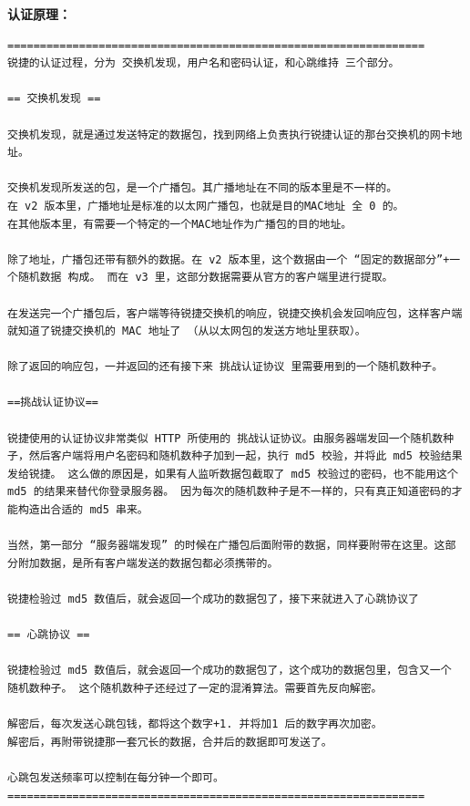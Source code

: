 \documentclass{itecreport-zh}
\begin{document}
\textbf{认证原理：}
\begin{verbatim}
================================================================
锐捷的认证过程，分为 交换机发现，用户名和密码认证，和心跳维持 三个部分。

== 交换机发现 ==

交换机发现，就是通过发送特定的数据包，找到网络上负责执行锐捷认证的那台交换机的网卡地址。

交换机发现所发送的包，是一个广播包。其广播地址在不同的版本里是不一样的。
在 v2 版本里，广播地址是标准的以太网广播包，也就是目的MAC地址 全 0 的。
在其他版本里，有需要一个特定的一个MAC地址作为广播包的目的地址。

除了地址，广播包还带有额外的数据。在 v2 版本里，这个数据由一个 “固定的数据部分”+一个随机数据 构成。 而在 v3 里，这部分数据需要从官方的客户端里进行提取。

在发送完一个广播包后，客户端等待锐捷交换机的响应，锐捷交换机会发回响应包，这样客户端就知道了锐捷交换机的 MAC 地址了 （从以太网包的发送方地址里获取）。

除了返回的响应包，一并返回的还有接下来 挑战认证协议 里需要用到的一个随机数种子。

==挑战认证协议==

锐捷使用的认证协议非常类似 HTTP 所使用的 挑战认证协议。由服务器端发回一个随机数种子，然后客户端将用户名密码和随机数种子加到一起，执行 md5 校验，并将此 md5 校验结果发给锐捷。 这么做的原因是，如果有人监听数据包截取了 md5 校验过的密码，也不能用这个 md5 的结果来替代你登录服务器。 因为每次的随机数种子是不一样的，只有真正知道密码的才能构造出合适的 md5 串来。

当然，第一部分 “服务器端发现” 的时候在广播包后面附带的数据，同样要附带在这里。这部分附加数据，是所有客户端发送的数据包都必须携带的。

锐捷检验过 md5 数值后，就会返回一个成功的数据包了，接下来就进入了心跳协议了

== 心跳协议 ==

锐捷检验过 md5 数值后，就会返回一个成功的数据包了，这个成功的数据包里，包含又一个 随机数种子。 这个随机数种子还经过了一定的混淆算法。需要首先反向解密。

解密后，每次发送心跳包钱，都将这个数字+1. 并将加1 后的数字再次加密。
解密后，再附带锐捷那一套冗长的数据，合并后的数据即可发送了。

心跳包发送频率可以控制在每分钟一个即可。
================================================================
\end{verbatim}
\end{document}
